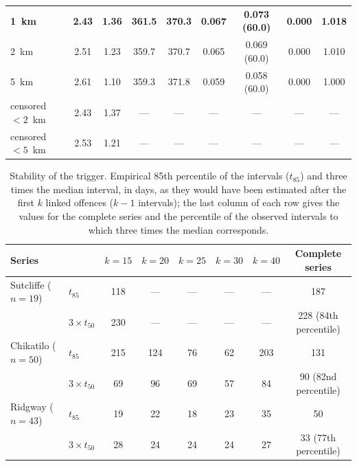 \begin{table}[htbp]
\begin{tabular}{lcccccccc}
\textbf{1~km} & \textbf{2.43} & \textbf{1.36} & \textbf{361.5} & \textbf{370.3} & \textbf{0.067} & \textbf{0.073 (60.0)} & \textbf{0.000} & \textbf{1.018}\\
2~km & 2.51 & 1.23 & 359.7 & 370.7 & 0.065 & 0.069 (60.0) & 0.000 & 1.010\\
5~km & 2.61 & 1.10 & 359.3 & 371.8 & 0.059 & 0.058 (60.0) & 0.000 & 1.000\\
censored $<2$~km & 2.43 & 1.37 & --- & --- & --- & --- & --- & ---\\
censored $<5$~km & 2.53 & 1.21 & --- & --- & --- & --- & --- & ---\\
\bottomrule
\end{tabular}
\end{table}

\begin{table}[htbp]
\centering\small
\caption{Stability of the trigger. Empirical 85th percentile of the intervals ($t_{85}$) and three times the median interval, in days, as they would have been estimated after the first $k$ linked offences ($k-1$ intervals); the last column of each row gives the values for the complete series and the percentile of the observed intervals to which three times the median corresponds.}
\begin{tabular}{llcccccc}
\toprule
Series & & $k=15$ & $k=20$ & $k=25$ & $k=30$ & $k=40$ & Complete series\\
\midrule
Sutcliffe ($n=19$) & $t_{85}$ & 118 & --- & --- & --- & --- & 187\\
 & $3\times t_{50}$ & 230 & --- & --- & --- & --- & 228 (84th percentile)\\
Chikatilo ($n=50$) & $t_{85}$ & 215 & 124 & 76 & 62 & 203 & 131\\
 & $3\times t_{50}$ & 69 & 96 & 69 & 57 & 84 & 90 (82nd percentile)\\
Ridgway ($n=43$) & $t_{85}$ & 19 & 22 & 18 & 23 & 35 & 50\\
 & $3\times t_{50}$ & 28 & 24 & 24 & 24 & 27 & 33 (77th percentile)\\
\bottomrule
\end{tabular}
\end{table}

